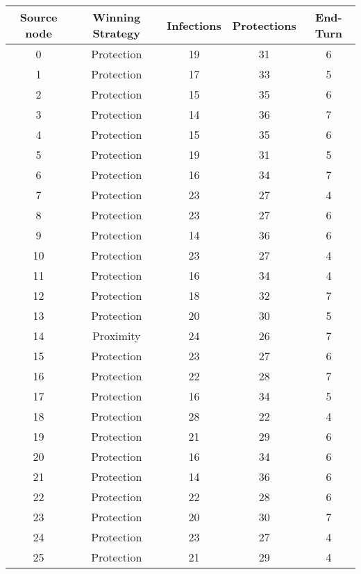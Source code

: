 \documentclass[results.tex]{subfiles}
\begin{document}
\begin{center}
  \begin{tabular}{| c || c | c | c | c |}
    \hline
    {\bfseries Source node} & {\bfseries Winning Strategy} & {\bfseries Infections} & {\bfseries Protections} & {\bfseries End-Turn} \\  %
    \hline\hline
    0 & Protection & 19 & 31 & 6 \\ 
    \hline
    1 & Protection & 17 & 33 & 5 \\ 
    \hline
    2 & Protection & 15 & 35 & 6 \\ 
    \hline
    3 & Protection & 14 & 36 & 7 \\ 
    \hline
    4 & Protection & 15 & 35 & 6 \\ 
    \hline
    5 & Protection & 19 & 31 & 5 \\ 
    \hline
    6 & Protection & 16 & 34 & 7 \\ 
    \hline
    7 & Protection & 23 & 27 & 4 \\ 
    \hline
    8 & Protection & 23 & 27 & 6 \\ 
    \hline
    9 & Protection & 14 & 36 & 6 \\ 
    \hline
    10 & Protection & 23 & 27 & 4 \\ 
    \hline
    11 & Protection & 16 & 34 & 4 \\ 
    \hline
    12 & Protection & 18 & 32 & 7 \\ 
    \hline
    13 & Protection & 20 & 30 & 5 \\ 
    \hline
    14 & Proximity & 24 & 26 & 7 \\ 
    \hline
    15 & Protection & 23 & 27 & 6 \\ 
    \hline
    16 & Protection & 22 & 28 & 7 \\ 
    \hline
    17 & Protection & 16 & 34 & 5 \\ 
    \hline
    18 & Protection & 28 & 22 & 4 \\ 
    \hline
    19 & Protection & 21 & 29 & 6 \\ 
    \hline
    20 & Protection & 16 & 34 & 6 \\ 
    \hline
    21 & Protection & 14 & 36 & 6 \\ 
    \hline
    22 & Protection & 22 & 28 & 6 \\ 
    \hline
    23 & Protection & 20 & 30 & 7 \\ 
    \hline
    24 & Protection & 23 & 27 & 4 \\ 
    \hline
    25 & Protection & 21 & 29 & 4 \\ 

\end{tabular}
\end{center}
\end{document}
